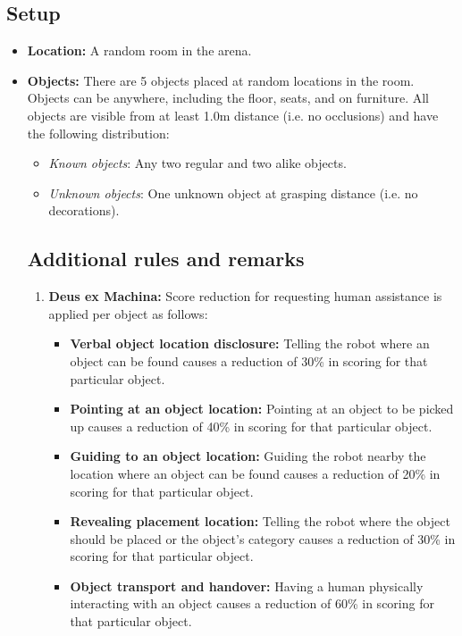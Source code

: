 \subsection{Setup}
\begin{itemize}[nosep]
	\item \textbf{Location:} A random room in the arena.

	\item \textbf{Objects:} There are 5 objects placed at random locations in the room.
	Objects can be anywhere, including the floor, seats, and on furniture.
	All objects are visible from at least 1.0m distance (i.e. no occlusions) and have the following distribution:
	\begin{itemize}[nosep]
		\item\textit{Known objects}: Any two regular and two alike objects.
		\item\textit{Unknown objects}: One unknown object at grasping distance (i.e. no decorations).
	\end{itemize}

\subsection{Additional rules and remarks}
\begin{enumerate}[nosep]
	\item \textbf{Deus ex Machina:} Score reduction for requesting human assistance is applied per object as follows:
	\begin{itemize}[nosep]
		\item \textbf{Verbal object location disclosure:} Telling the robot where an object can be found causes a reduction of 30\% in scoring for that particular object.

		\item \textbf{Pointing at an object location:} Pointing at an object to be picked up causes a reduction of 40\% in scoring for that particular object.
		
		\item \textbf{Guiding to an object location:} Guiding the robot nearby the location where an object can be found causes a reduction of 20\% in scoring for that particular object.

		\item \textbf{Revealing placement location:} Telling the robot where the object should be placed or the object's category causes a reduction of 30\% in scoring for that particular object.

		\item \textbf{Object transport and handover:} Having a human physically interacting with an object causes a reduction of 60\% in scoring for that particular object.
	\end{itemize}
	

\end{enumerate}
\end{itemize}

